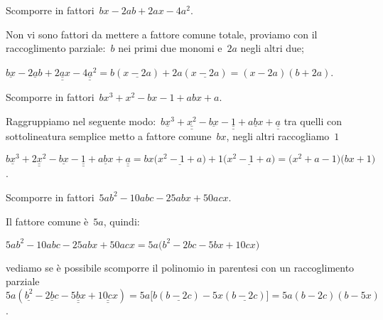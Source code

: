
 \begin{esempio}
Scomporre in fattori~\(bx-2ab+2ax-4a^{2}\).
 \begin{enumeratea}
 \item Non vi sono fattori da mettere a fattore comune totale, proviamo con 
  il raccoglimento parziale:~\(b\) nei primi due monomi e~\(2a\) negli altri 
due;
 \item \(\underline{bx} -\underline{2ab}+\underline{\underline{2ax}}-
        \underline{\underline{4a^{2}}}=
        b(\underline{x-2a})+2a(\underline{x-2a})=(x-2a)(b+2a)\).
 \end{enumeratea}
 \end{esempio}

 \begin{esempio}
Scomporre in fattori~\(bx^3+x^2-bx-1+abx+a\).
 \begin{enumeratea}
  \item Raggruppiamo nel seguente 
   modo:~\(\underline{bx^3}+\underline{\underline {x^2}}-\underline{bx}-
          \underline{\underline{1}}+\underline{abx}+\underline{\underline{a}}\) 
   tra quelli con sottolineatura semplice metto a fattore comune~\(bx\), 
   negli altri raccogliamo~\(1\)
  \item
   \(\underline{bx^3}+\underline{\underline {2x^2}}-\underline{bx}-
    \underline{\underline{1}}+\underline{abx}+\underline{\underline{a}}=
    bx\bigl(\underline{x^2-1+a}\bigr)+1\bigl(\underline{x^2-1+a}\bigr)=
    \bigl(x^2+a-1\bigr)\bigl(bx+1\bigr)\).
 \end{enumeratea}
 \end{esempio}

 \begin{esempio}
Scomporre in fattori~\(5ab^{2}-10abc-25abx+50acx\).
 \begin{enumeratea}
  \item Il fattore comune è~\(5a\), quindi:
    \begin{itemize*}
    \item \(5ab^{2}-10abc-25abx+50acx=5a\bigl(b^{2}-2bc-5bx+10cx\bigr)\)
    \end{itemize*}
  \item vediamo se è possibile scomporre il polinomio in parentesi con un 
   raccoglimento parziale~\(5a(\underline{b^{2}}-\underline{2bc}
     -\underline{\underline{5bx}}+\underline{\underline{10cx}})=
     5a\bigl[b(\underline{b-2c})-5x(\underline{b-2c})\bigr]=5a(b-2c)(b-5x)\).
 \end{enumeratea}
 \end{esempio}

